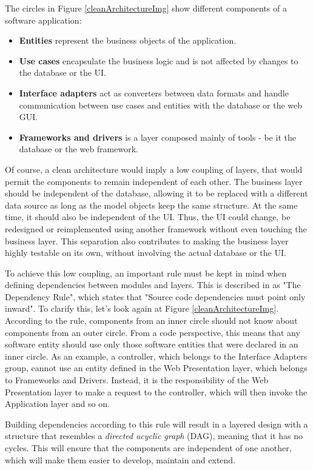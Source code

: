 The circles in Figure \ref{cleanArchitectureImg} show different components of a software application:

\begin{itemize}
    \item \textbf{Entities} represent the business objects of the application.
    \item \textbf{Use cases} encapsulate the business logic and is not affected by changes to the database or the UI.
    \item \textbf{Interface adapters} act as converters between data formats and handle communication between use cases and entities with the database or the web GUI.
    \item \textbf{Frameworks and drivers} is a layer composed mainly of tools - be it the database or the web framework.
\end{itemize}

Of course, a clean architecture would imply a low coupling of layers, that would permit the components to remain independent of each other. The business layer should be independent of the database, allowing it to be replaced with a different data source as long as the model objects keep the same structure. At the same time, it should also be independent of the UI. Thus, the UI could change, be redesigned or reimplemented using another framework without even touching the business layer. This separation also contributes to making the business layer highly testable on its own, without involving the actual database or the UI.

To achieve this low coupling, an important rule must be kept in mind when defining dependencies between modules and layers. This is described in \cite{cleanArchitecture} as "The Dependency Rule", which states that "Source code dependencies must point only inward". To clarify this, let's look again at Figure \ref{cleanArchitectureImg}. According to the rule, components from an inner circle should not know about components from an outer circle. From a code perspective, this means that any software entity should use only those software entities that were declared in an inner circle. As an example, a controller, which belongs to the Interface Adapters group, cannot use an entity defined in the Web Presentation layer, which belongs to Frameworks and Drivers. Instead, it is the responsibility of the Web Presentation layer to make a request to the controller, which will then invoke the Application layer and so on.

Building dependencies according to this rule will result in a layered design with a structure that resembles a \textit{directed acyclic graph} (DAG), meaning that it has no cycles. This will ensure that the components are independent of one another, which will make them easier to develop, maintain and extend.


